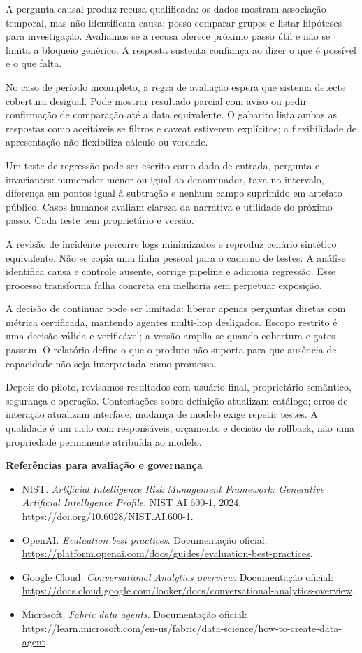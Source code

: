 A pergunta causal produz recusa qualificada: os dados mostram associação temporal, mas não identificam causa; posso comparar grupos e listar hipóteses para investigação. Avaliamos se a recusa oferece próximo passo útil e não se limita a bloqueio genérico. A resposta sustenta confiança ao dizer o que é possível e o que falta.

No caso de período incompleto, a regra de avaliação espera que sistema detecte cobertura desigual. Pode mostrar resultado parcial com aviso ou pedir confirmação de comparação até a data equivalente. O gabarito lista ambas as respostas como aceitáveis se filtros e caveat estiverem explícitos; a flexibilidade de apresentação não flexibiliza cálculo ou verdade.

Um teste de regressão pode ser escrito como dado de entrada, pergunta e invariantes: numerador menor ou igual ao denominador, taxa no intervalo, diferença em pontos igual à subtração e nenhum campo suprimido em artefato público. Casos humanos avaliam clareza da narrativa e utilidade do próximo passo. Cada teste tem proprietário e versão.

A revisão de incidente percorre logs minimizados e reproduz cenário sintético equivalente. Não se copia uma linha pessoal para o caderno de testes. A análise identifica causa e controle ausente, corrige pipeline e adiciona regressão. Esse processo transforma falha concreta em melhoria sem perpetuar exposição.

A decisão de continuar pode ser limitada: liberar apenas perguntas diretas com métrica certificada, mantendo agentes multi-hop desligados. Escopo restrito é uma decisão válida e verificável; a versão amplia-se quando cobertura e gates passam. O relatório define o que o produto não suporta para que ausência de capacidade não seja interpretada como promessa.

Depois do piloto, revisamos resultados com usuário final, proprietário semântico, segurança e operação. Contestações sobre definição atualizam catálogo; erros de interação atualizam interface; mudança de modelo exige repetir testes. A qualidade é um ciclo com responsáveis, orçamento e decisão de rollback, não uma propriedade permanente atribuída ao modelo.

\bigskip
\noindent\textbf{Referências para avaliação e governança}

\begingroup\small
\begin{itemize}
\item NIST. \emph{Artificial Intelligence Risk Management Framework: Generative Artificial Intelligence Profile}. NIST AI 600-1, 2024. \url{https://doi.org/10.6028/NIST.AI.600-1}.
\item OpenAI. \emph{Evaluation best practices}. Documentação oficial: \url{https://platform.openai.com/docs/guides/evaluation-best-practices}.
\item Google Cloud. \emph{Conversational Analytics overview}. Documentação oficial: \url{https://docs.cloud.google.com/looker/docs/conversational-analytics-overview}.
\item Microsoft. \emph{Fabric data agents}. Documentação oficial: \url{https://learn.microsoft.com/en-us/fabric/data-science/how-to-create-data-agent}.
\end{itemize}
\endgroup
